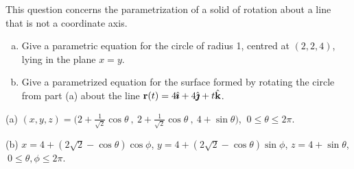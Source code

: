 \begin{question}
This question concerns the parametrization of a solid of rotation about a line that is not a coordinate axis.

\begin{enumerate}[(a)]
\item Give a parametric equation for the circle of radius 1, centred at $(2,2,4)$, lying in the plane $x=y$.
\item Give a parametrized equation for the surface formed by rotating the circle from part (a) about the line $\mathbf{r}(t)=4\hat{\pmb{\imath}}+4\hat{\pmb{\jmath}}+t\hat{\mathbf{k}}$. 
\end{enumerate}
\begin{center}
\end{center}

\end{question}
\begin{answer}
(a) $(x,y,z)=\big(2+\frac1{\sqrt 2}\cos\theta~,~2+\frac1{\sqrt 2}\cos\theta~,~4+\sin\theta\big)$, $\ 0 \le \theta \le 2\pi$.

(b) $x=4+(2\sqrt2-\cos\theta)\cos\phi$, $y=4+(2\sqrt2-\cos\theta)\sin\phi$, $z=4+\sin\theta$, $\ 0 \le \theta,\phi \le 2\pi$.
\end{answer}
